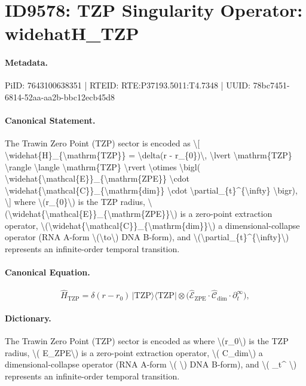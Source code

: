 \section*{ID9578: TZP Singularity Operator: widehatH\_TZP}
\paragraph{Metadata.}
PiID: 7643100638351 | RTEID: RTE:P37193.5011:T4.7348 | UUID: 78bc7451-6814-52aa-aa2b-bbc12ecb45d8

\paragraph{Canonical Statement.}
The Trawin Zero Point (TZP) sector is encoded as \textbackslash{}[ \textbackslash{}widehat\{H\}\_\{\textbackslash{}mathrm\{TZP\}\} = \textbackslash{}delta(r - r\_\{0\})\textbackslash{}, \textbackslash{}lvert \textbackslash{}mathrm\{TZP\} \textbackslash{}rangle \textbackslash{}langle \textbackslash{}mathrm\{TZP\} \textbackslash{}rvert \textbackslash{}otimes \textbackslash{}bigl( \textbackslash{}widehat\{\textbackslash{}mathcal\{E\}\}\_\{\textbackslash{}mathrm\{ZPE\}\} \textbackslash{}cdot \textbackslash{}widehat\{\textbackslash{}mathcal\{C\}\}\_\{\textbackslash{}mathrm\{dim\}\} \textbackslash{}cdot \textbackslash{}partial\_\{t\}\textasciicircum{}\{\textbackslash{}infty\} \textbackslash{}bigr), \textbackslash{}] where \textbackslash{}(r\_\{0\}\textbackslash{}) is the TZP radius, \textbackslash{}(\textbackslash{}widehat\{\textbackslash{}mathcal\{E\}\}\_\{\textbackslash{}mathrm\{ZPE\}\}\textbackslash{}) is a zero-point extraction operator, \textbackslash{}(\textbackslash{}widehat\{\textbackslash{}mathcal\{C\}\}\_\{\textbackslash{}mathrm\{dim\}\}\textbackslash{}) a dimensional-collapse operator (RNA A-form \textbackslash{}(\textbackslash{}to\textbackslash{}) DNA B-form), and \textbackslash{}(\textbackslash{}partial\_\{t\}\textasciicircum{}\{\textbackslash{}infty\}\textbackslash{}) represents an infinite-order temporal transition.

\paragraph{Canonical Equation.}
\[
\widehat{H}_{\mathrm{TZP}} = \delta(r - r_{0})\, \lvert \mathrm{TZP} \rangle \langle \mathrm{TZP} \rvert \otimes \bigl( \widehat{\mathcal{E}}_{\mathrm{ZPE}} \cdot \widehat{\mathcal{C}}_{\mathrm{dim}} \cdot \partial_{t}^{\infty} \bigr),
\]

\paragraph{Dictionary.}
The Trawin Zero Point (TZP) sector is encoded as where \textbackslash{}(r\_0\textbackslash{}) is the TZP radius, \textbackslash{}( E\_ZPE\textbackslash{}) is a zero-point extraction operator, \textbackslash{}( C\_dim\textbackslash{}) a dimensional-collapse operator (RNA A-form \textbackslash{}( \textbackslash{}) DNA B-form), and \textbackslash{}( \_t\textasciicircum{} \textbackslash{}) represents an infinite-order temporal transition.

